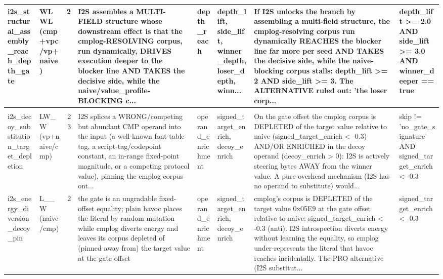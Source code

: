 \documentclass[7pt]{extarticle}
\begin{document}
{\begin{longtable}{@{}p{2.4cm}p{1.9cm}rp{4.3cm}p{1.5cm}p{1.7cm}p{4.6cm}p{3.0cm}@{}}
i2s\_\allowbreak structural\_\allowbreak assembly\_\allowbreak reach\_\allowbreak depth\_\allowbreak gate & WLWL (cmp+vpc/vp+naive) & 2 & I2S assembles a MULTI-FIELD structure whose downstream effect is that the cmplog-RESOLVING corpus, run dynamically, DRIVES execution deeper to the blocker line AND TAKES the decisive side, while the naive/value\_\allowbreak profile-BLOCKING c... & depth\_\allowbreak reach & depth\_\allowbreak lift, side\_\allowbreak lift, winner\_\allowbreak depth, loser\_\allowbreak depth, winn... & If I2S unlocks the branch by assembling a multi-field structure, the cmplog-resolving corpus run dynamically REACHES the blocker line far more per seed AND TAKES the decisive side, while the naive-blocking corpus stalls: depth\_\allowbreak lift \textgreater{}= 2 AND side\_\allowbreak lift \textgreater{}= 3. The ALTERNATIVE ruled out: 'the loser corp... & depth\_\allowbreak lift \textgreater{}= 2.0 AND side\_\allowbreak lift \textgreater{}= 3.0 AND winner\_\allowbreak deeper == true\\
\midrule
\rowcolor{black!10}\multicolumn{8}{@{}l}{\textbf{[I2S-anti]\ \ i2s\_\allowbreak anti\_\allowbreak target\_\allowbreak depletion}\quad(final feature, n=25)}\\
i2s\_\allowbreak decoy\_\allowbreak substitution\_\allowbreak target\_\allowbreak depletion & LW\_\allowbreak W (vp+naive/cmp) & 23 & I2S splices a WRONG/competing but abundant CMP operand into the input (a well-known font-table tag, a script-tag/codepoint constant, an in-range fixed-point magnitude, or a competing protocol value), pinning the cmplog corpus ont... & operand\_\allowbreak enrichment & signed\_\allowbreak target\_\allowbreak enrich, decoy\_\allowbreak enrich & On the gate offset the cmplog corpus is DEPLETED of the target value relative to naive (signed\_\allowbreak target\_\allowbreak enrich \textless{} -0.3) AND/OR ENRICHED in the decoy operand (decoy\_\allowbreak enrich \textgreater{} 0): I2S is actively steering bytes AWAY from the winner value. A pure-overhead mechanism (I2S has no operand to substitute) would... & skip != 'no\_\allowbreak gate\_\allowbreak signature' AND signed\_\allowbreak target\_\allowbreak enrich \textless{} -0.3\\
i2s\_\allowbreak energy\_\allowbreak diversion\_\allowbreak decoy\_\allowbreak pin & L\_\allowbreak \_\allowbreak W (naive/cmp) & 2 & the gate is an ungradable fixed-offset equality; plain havoc places the literal by random mutation while cmplog diverts energy and leaves its corpus depleted of (pinned away from) the target value at the gate offset & operand\_\allowbreak enrichment & signed\_\allowbreak target\_\allowbreak enrich, decoy\_\allowbreak enrich & cmplog's corpus is DEPLETED of the target value 0x05E9 at the gate offset relative to naive: signed\_\allowbreak target\_\allowbreak enrich \textless{} -0.3 (anti). I2S introspection diverts energy without learning the equality, so cmplog under-represents the literal that havoc reaches incidentally. The PRO alternative (I2S substitut... & signed\_\allowbreak target\_\allowbreak enrich \textless{} -0.3\\

\end{longtable}}
\end{document}
